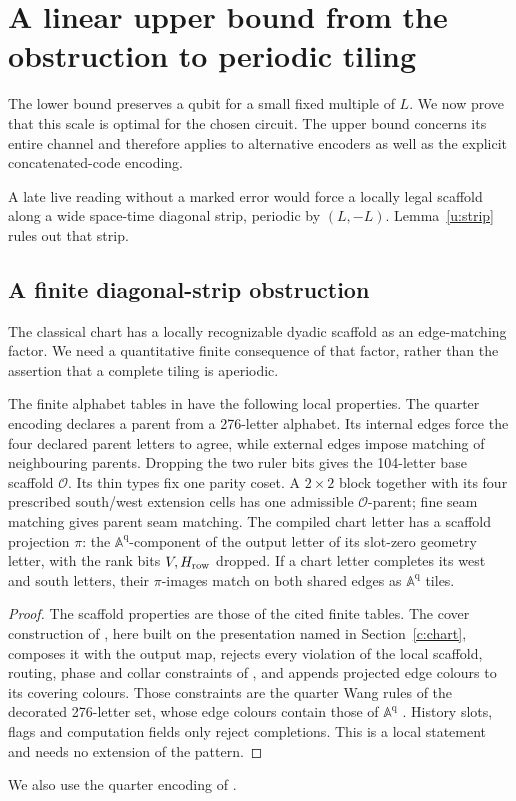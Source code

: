 \section{A linear upper bound from the obstruction to periodic tiling}\label{sec:ceiling}

The lower bound preserves a qubit for a small fixed multiple of
\(L\). We now prove that this scale is optimal for the chosen circuit.
The upper bound concerns its entire channel and therefore applies to
alternative encoders as well as the explicit concatenated-code encoding.

A late live reading without a marked error would force a locally legal scaffold along a wide space-time diagonal strip, periodic by \((L,-L)\). Lemma~\ref{u:strip} rules out that strip.

\subsection{A finite diagonal-strip obstruction}
The classical chart has a locally recognizable dyadic scaffold as an
edge-matching factor. We need a quantitative finite consequence of that
factor, rather than the assertion that a complete tiling is aperiodic.
\begin{proposition}\label{u:scaffold-import}
The finite alphabet tables in \cite[Definitions~3.1, 3.2 and~3.8, Lemma~3.9, and Lemmas~A.1--A.3]{DMPhase2026} have the following local
properties. The quarter encoding declares a parent from a 276-letter
alphabet. Its internal edges force the four declared parent letters to
agree, while external edges impose matching of neighbouring parents.
Dropping the two ruler bits gives the 104-letter base scaffold
\(\mathcal O\). Its thin types fix one parity coset. A \(2\times2\)
block together with its four prescribed south/west extension cells has
one admissible \(\mathcal O\)-parent; fine seam matching gives parent
seam matching. The compiled chart letter has a scaffold projection
\(\pi\): the \(\mathbb A^{\mathrm q}\)-component of the output letter
of its slot-zero geometry letter, with the rank bits \(V,H_{\rm row}\)
dropped. If a chart letter completes its west and south letters,
their \(\pi\)-images match on both shared edges as
\(\mathbb A^{\mathrm q}\) tiles.
\end{proposition}
\begin{proof}
The scaffold properties are those of the cited finite tables.
The cover construction of \cite[Lemma~11.2]{DMNoise2026}, here built
on the presentation named in Section~\ref{c:chart}, composes it with
the output map, rejects every violation of the local scaffold,
routing, phase and collar constraints of \cite[Section~3]{DMNoise2026},
and appends projected edge colours to its covering colours. Those
constraints are the quarter Wang rules of the decorated 276-letter
set, whose edge colours contain those of \(\mathbb A^{\mathrm q}\)
\cite[Definition~3.8]{DMPhase2026}. History slots, flags and computation
fields only reject completions. This is a local statement and needs
no extension of the pattern.
\end{proof}
We also use the quarter encoding of \cite[Definition~3.8 and Lemma~3.9]{DMPhase2026}.

